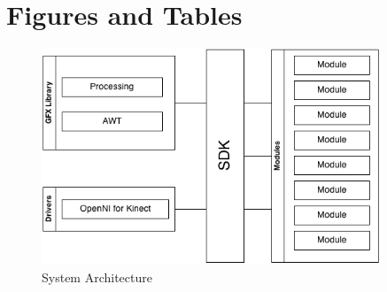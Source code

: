 \documentclass[11pt,letterpaper]{article}
\begin{document}
	\pagebreak
   
	\section{Figures and Tables}
	\begin{figure}[h!]
		\caption{System Architecture}
		\centering
		\includegraphics[width=0.9\textwidth]{overview}
	\end{figure}
	\pagebreak
\end{document}
